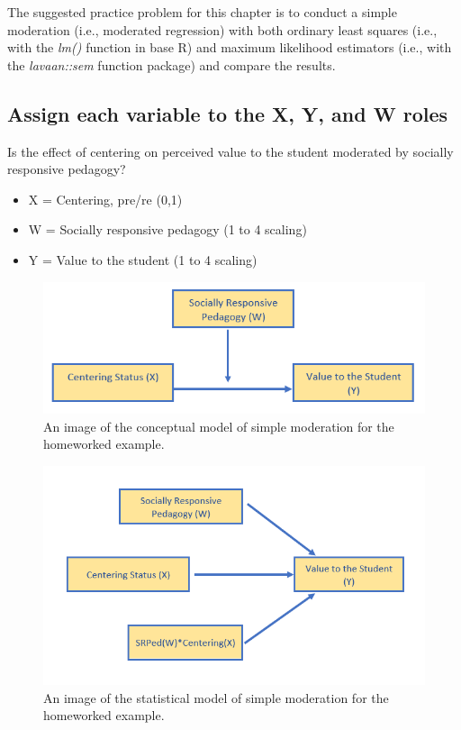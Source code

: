 \documentclass[
  11pt,
]{book}
\providecommand{\tightlist}{%
  \setlength{\itemsep}{0pt}\setlength{\parskip}{0pt}}
\begin{document}
The suggested practice problem for this chapter is to conduct a simple moderation (i.e., moderated regression) with both ordinary least squares (i.e., with the \emph{lm()} function in base R) and maximum likelihood estimators (i.e., with the \emph{lavaan::sem} function package) and compare the results.

\hypertarget{assign-each-variable-to-the-x-y-and-w-roles}{%
\subsection*{Assign each variable to the X, Y, and W roles}\label{assign-each-variable-to-the-x-y-and-w-roles}}


Is the effect of centering on perceived value to the student moderated by socially responsive pedagogy?

\begin{itemize}
\tightlist
\item
  X = Centering, pre/re (0,1)
\item
  W = Socially responsive pedagogy (1 to 4 scaling)
\item
  Y = Value to the student (1 to 4 scaling)
\end{itemize}

\begin{figure}
\centering
\includegraphics{Worked_Examples/images/HW_SimpMod1.png}
\caption{An image of the conceptual model of simple moderation for the homeworked example.}
\end{figure}

\begin{figure}
\centering
\includegraphics{Worked_Examples/images/HW_SimpMod2.png}
\caption{An image of the statistical model of simple moderation for the homeworked example.}
\end{figure}
\end{document}
